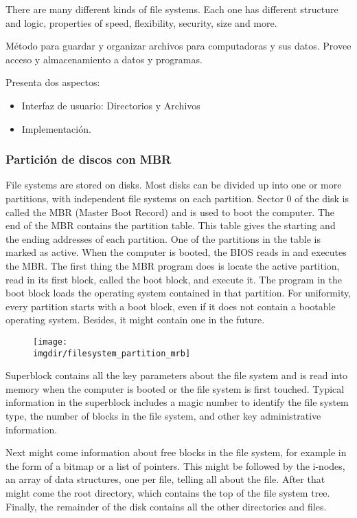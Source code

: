 \documentclass[a4paper, twoside]{article}
\newcommand{\imgdir}{../resources/images} %
\begin{document}
There are many different kinds of file systems. Each one has different structure and logic, properties of speed, flexibility, security, size and more.

Método para guardar y organizar archivos para computadoras y sus datos. Provee acceso y almacenamiento a datos y programas.

Presenta dos aspectos:
\begin{itemize}
	\item Interfaz de usuario: Directorios y Archivos
	\item Implementación.
\end{itemize}

\subsubsection{Partición de discos con MBR}
File systems are stored on disks. Most disks can be divided up into one or more partitions, with independent file systems on each partition. Sector 0 of the disk is called the MBR (Master Boot Record) and is used to boot the computer. The end of the MBR contains the partition table. This table gives the starting and the ending addresses of each partition. One of the partitions in the table is marked as active. When the computer is booted, the BIOS reads in and executes the MBR. The first thing the MBR program does is locate the active partition, read in its first block, called the boot block, and execute it. The program in the boot block loads the operating system contained in that partition. For uniformity, every partition starts with a boot block, even if it does not contain a bootable operating system. Besides, it might contain one in the future.

\begin{figure}[H]
	\centering
	\texttt{[image: \\imgdir/filesystem\_partition\_mrb]}
	\label{fig:filesystem_partition_mrb}
\end{figure}

Superblock contains all the key parameters about the file system and is read into memory when the computer is booted or the file system is first touched. Typical information in the superblock includes a magic number to identify the file system type, the number of blocks in the file system, and other key administrative information.

Next might come information about free blocks in the file system, for example in the form of a bitmap or a list of pointers. This might be followed by the i-nodes, an array of data structures, one per file, telling all about the file. After that might come the root directory, which contains the top of the file system tree. Finally, the remainder of the disk contains all the other directories and files.
\end{document}
